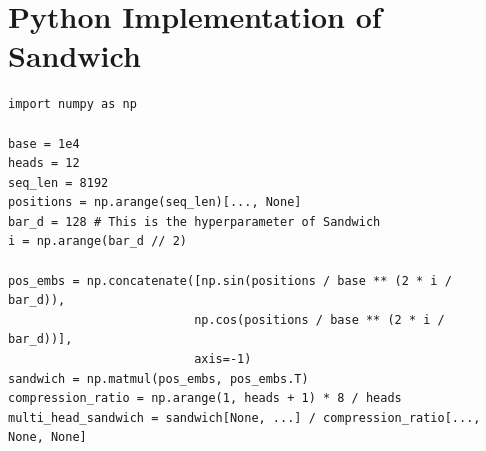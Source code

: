 \documentclass[11pt]{article}
\theoremstyle{plain}
\begin{document}
\clearpage
\section{Python Implementation of Sandwich}
\label{sec:python_impl}
\begin{verbatim}
import numpy as np

base = 1e4
heads = 12
seq_len = 8192
positions = np.arange(seq_len)[..., None]
bar_d = 128 # This is the hyperparameter of Sandwich
i = np.arange(bar_d // 2)

pos_embs = np.concatenate([np.sin(positions / base ** (2 * i / bar_d)),
                          np.cos(positions / base ** (2 * i / bar_d))],
                          axis=-1)
sandwich = np.matmul(pos_embs, pos_embs.T)
compression_ratio = np.arange(1, heads + 1) * 8 / heads
multi_head_sandwich = sandwich[None, ...] / compression_ratio[..., None, None]
\end{verbatim}
\end{document}
